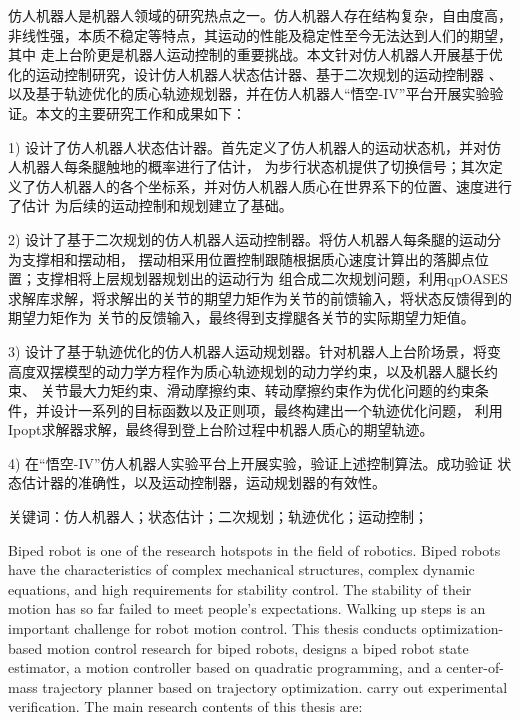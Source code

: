 \cleardoublepage
{}

仿人机器人是机器人领域的研究热点之一。仿人机器人存在结构复杂，自由度高，非线性强，本质不稳定等特点，其运动的性能及稳定性至今无法达到人们的期望，其中
走上台阶更是机器人运动控制的重要挑战。本文针对仿人机器人开展基于优化的运动控制研究，设计仿人机器人状态估计器、基于二次规划的运动控制器
、以及基于轨迹优化的质心轨迹规划器，并在仿人机器人“悟空-IV”平台开展实验验证。本文的主要研究工作和成果如下：

1) 设计了仿人机器人状态估计器。首先定义了仿人机器人的运动状态机，并对仿人机器人每条腿触地的概率进行了估计，
为步行状态机提供了切换信号；其次定义了仿人机器人的各个坐标系，并对仿人机器人质心在世界系下的位置、速度进行了估计
为后续的运动控制和规划建立了基础。

2) 设计了基于二次规划的仿人机器人运动控制器。将仿人机器人每条腿的运动分为支撑相和摆动相，
摆动相采用位置控制跟随根据质心速度计算出的落脚点位置；支撑相将上层规划器规划出的运动行为
组合成二次规划问题，利用qpOASES求解库求解，将求解出的关节的期望力矩作为关节的前馈输入，将状态反馈得到的期望力矩作为
关节的反馈输入，最终得到支撑腿各关节的实际期望力矩值。

3) 设计了基于轨迹优化的仿人机器人运动规划器。针对机器人上台阶场景，将变高度双摆模型的动力学方程作为质心轨迹规划的动力学约束，以及机器人腿长约束、
关节最大力矩约束、滑动摩擦约束、转动摩擦约束作为优化问题的约束条件，并设计一系列的目标函数以及正则项，最终构建出一个轨迹优化问题，
利用Ipopt求解器求解，最终得到登上台阶过程中机器人质心的期望轨迹。

4) 在“悟空-IV”仿人机器人实验平台上开展实验，验证上述控制算法。成功验证
状态估计器的准确性，以及运动控制器，运动规划器的有效性。

$\textbf{关键词}$：仿人机器人；状态估计；二次规划；轨迹优化；运动控制；

\cleardoublepage
{}

Biped robot is one of the research hotspots in the field of robotics. Biped robots have the characteristics of complex mechanical structures, 
complex dynamic equations, and high requirements for stability control. The stability of their motion has so far failed to meet people's expectations. 
Walking up steps is an important challenge for robot motion control. This thesis conducts optimization-based motion control research for biped robots, 
designs a biped robot state estimator, a motion controller based on quadratic programming, and a center-of-mass trajectory planner based on trajectory optimization. 
carry out experimental verification. The main research contents of this thesis are:

